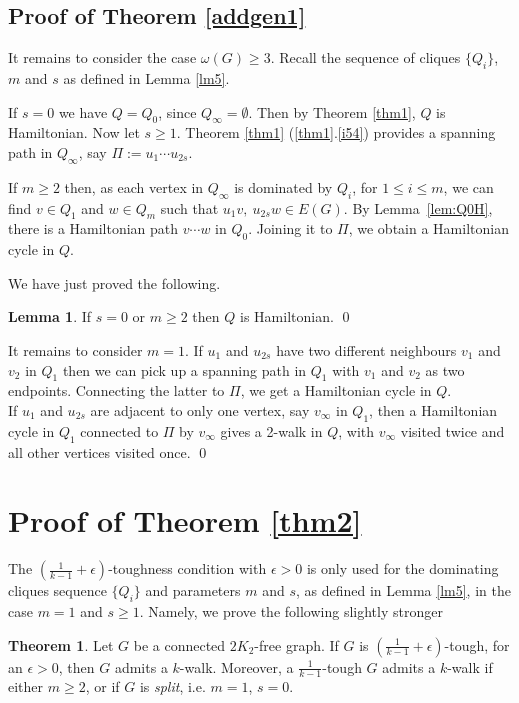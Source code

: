 \documentclass{amsart}
\theoremstyle{definition}
\newtheorem{theorem}{Theorem}
\newtheorem{lemma}{Lemma}
\begin{document}
\subsection{Proof of Theorem \ref{addgen1}}
It remains to consider the case $\omega(G)\ge3$.
Recall the sequence of cliques $\{Q_i\}$, $m$ and $s$ as defined in Lemma \ref{lm5}.


If $s=0$ we have $Q=Q_0$, since $Q_{\infty}=\emptyset$. Then by Theorem \ref{thm1}, $Q$ is Hamiltonian.
Now let $s\geq 1$. 
Theorem \ref{thm1} (\ref{thm1}.\ref{i54}) provides 
a spanning path in $Q_{\infty}$, say $\Pi:=u_1\cdots u_{2s}$. 

If $m\ge2$ then, 
as each vertex in $Q_{\infty}$ is dominated by $Q_i$, for $1\le i\le m$, we
can find $v\in Q_1$ and $w\in Q_m$ such that
$u_1v,~u_{2s}w\in E(G)$. By Lemma~\ref{lem:Q0H}, there is a Hamiltonian path  $v\cdots w$ in $Q_0$.
Joining it to $\Pi$, we obtain a Hamiltonian cycle in $Q$.

We have just proved the following.
\begin{lemma}\label{lem:HamQ}
If $s=0$ or $m\geq 2$ then $Q$ is Hamiltonian. \qed
\end{lemma}
It remains to consider {$m=1$}.
If $u_1$ and $u_{2s}$ have two different neighbours $v_1$ and $v_2$ in $Q_1$
then we can pick up a spanning path in $Q_1$ with $v_1$ and $v_2$ as two endpoints. 
Connecting the latter to $\Pi$, we get a Hamiltonian cycle in $Q$. \\
If $u_1$ and $u_{2s}$ are adjacent to only one vertex, say $v_{\infty}$ in $Q_1$, 
then a Hamiltonian cycle in $Q_1$
connected to $\Pi$ by $v_{\infty}$ gives a 2-walk in $Q$, with $v_{\infty}$ visited twice and all other vertices visited once. 
\qed

\section{Proof of Theorem \ref{thm2}}



The $(\frac{1}{k-1}+\epsilon)$-toughness condition with $\epsilon>0$ 
is only used for the dominating cliques sequence $\{Q_i\}$ 
and parameters $m$ and $s$, as defined in Lemma \ref{lm5},
in the case $m=1$ and $s\geq 1$. Namely, we prove the following
slightly stronger
\begin{theorem}\label{opt}
Let $G$ be a connected $2K_2$-free graph.
If $G$ is $\left(\frac{1}{k-1}+\epsilon\right)$-tough, for an
$\epsilon>0$, then $G$ admits a $k$-walk. 
Moreover, a $\frac{1}{k-1}$-tough $G$ admits a $k$-walk if either
$m\ge2$, or if $G$ is {\em split}, i.e. $m=1$, $s=0$.  
\end{theorem}
\end{document}
